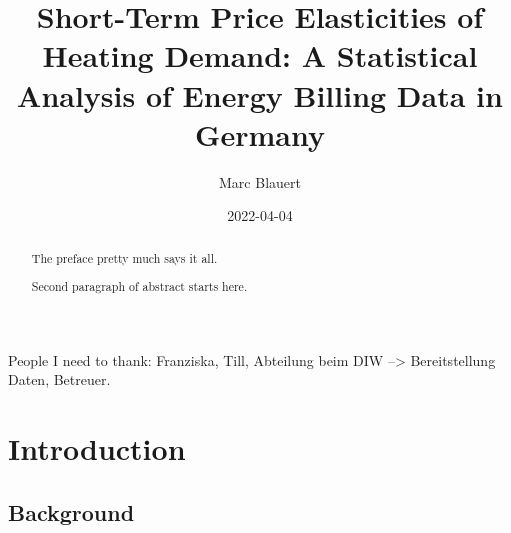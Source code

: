 \documentclass[12pt,twoside]{reedthesis}
\title{Short-Term Price Elasticities of Heating Demand: A Statistical Analysis of Energy Billing Data in Germany}
\author{Marc Blauert}
\date{2022-04-04}
\begin{document}
  \maketitle

\frontmatter %
\pagestyle{empty} %
  \begin{acknowledgements}
    People I need to thank: Franziska, Till, Abteilung beim DIW --\textgreater{} Bereitstellung Daten, Betreuer.
  \end{acknowledgements}

  \hypersetup{linkcolor=black}
  \setcounter{secnumdepth}{2}
  \setcounter{tocdepth}{2}
  \tableofcontents

  \listoftables

  \listoffigures
  \begin{abstract}
    The preface pretty much says it all.

    \par

    Second paragraph of abstract starts here.
  \end{abstract}

\mainmatter %
\pagestyle{fancyplain} %

\setlength{\parskip}{6pt} %

\hypertarget{introduction}{%
\chapter{Introduction}\label{introduction}}

\hypertarget{background}{%
\section{Background}\label{background}}
\end{document}
